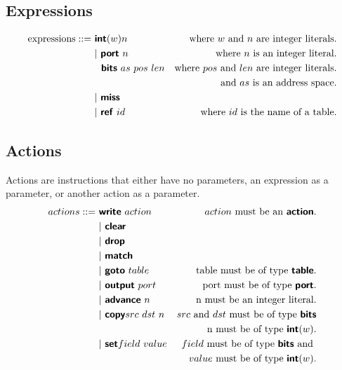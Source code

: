 \subsection{Expressions}
\begin{align*}
  \text{expressions} ::=~& \mathct{int}(w) n    & \text{where} \ w \ \text{and} \ n \ \text{are integer literals.}\\
  & | \ \mathct{port} \ n   & \text{where } n \text{ is an integer literal.}\\
  & \ \ \mathct{bits} \ as \ pos \ len &\text{where } pos \text{ and } len \text{ are integer literals.} \\ & &\text{and } as \text{ is an address space.}\\
  & | \ \mathct{miss}\\
  & | \ \mathct{ref} \ id    &\text{where } id \text{ is the name of a table.}
\end{align*}
\subsection{Actions}

Actions are instructions that either have no parameters, an expression as a parameter, or another action as a parameter.
\begin{align*}
actions::=~&  \bm{\mathsf{{write}}} \ action     & action \text{ must be an } \bm{\mathsf{{action}}}.\\
  & | \ \bm{\mathsf{{clear}}}\\
  & | \ \bm{\mathsf{{drop}}}\\
  & | \ \bm{\mathsf{{match}}}\\
  & | \ \bm{\mathsf{{goto}}} \ table             & \text{table must be of type } \bm{\mathsf{{table}}}.\\
  & | \ \bm{\mathsf{{output}}} \ port            & \text{port must be of type } \bm{\mathsf{{port}}}.\\
  & | \ \bm{\mathsf{{advance}}} \ n              & \text{n must be an integer literal.}\\
  & | \ \bm{\mathsf{{copy}}} src \ dst \ n       & src \text{ and } dst \text{ must be of type } \bm{\mathsf{{bits}}} \\
                                         && \text{n must be of type } \bm{\mathsf{{int}}}(w).\\
  & | \ \bm{\mathsf{{set}}} field \ value        & field \text{ must be of type } \bm{\mathsf{{bits}}} \text{ and }\\
                                         && value \text{ must be of type } \bm{\mathsf{{int}}}(w).
\end{align*}
